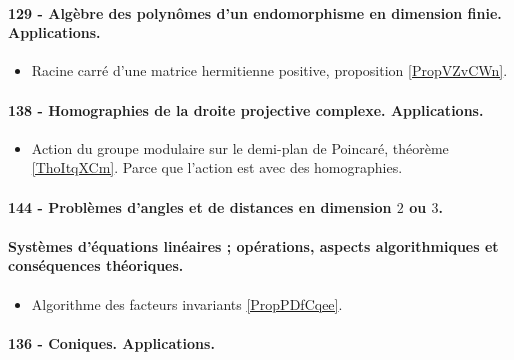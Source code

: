 \paragraph{129 - Algèbre des polynômes d'un endomorphisme en dimension finie. Applications.}
\begin{itemize}
    \item Racine carré d'une matrice hermitienne positive, proposition \ref{PropVZvCWn}.
\end{itemize}
\paragraph{138 - Homographies de la droite projective complexe. Applications.}
\begin{itemize}
    \item Action du groupe modulaire sur le demi-plan de Poincaré, théorème \ref{ThoItqXCm}. Parce que l'action est avec des homographies.
\end{itemize}
\paragraph{144 - Problèmes d’angles et de distances en dimension $2$ ou $3$.}
\paragraph{Systèmes d'équations linéaires ; opérations, aspects algorithmiques et conséquences théoriques.}
\begin{itemize}
    \item Algorithme des facteurs invariants \ref{PropPDfCqee}.
\end{itemize}
\paragraph{136 - Coniques. Applications.}
